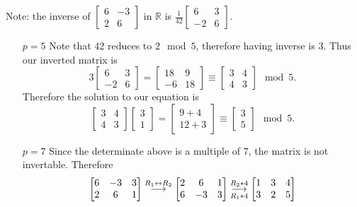\documentclass[12pt, letterpaper]{article}
\newcommand{\R}{\mathbb{R}}
\newcommand{\grstep}[2][\relax]{%
   \ensuremath{\mathrel{
       {\mathop{\longrightarrow}\limits^{#2\mathstrut}_{
                                     \begin{subarray}{l} #1 \end{subarray}}}}}}
\newcommand{\swap}{\leftrightarrow}
\begin{document}
\begin{enumerate}
	Note: the inverse of $\begin{bmatrix}6 & -3\\ 2 & 6 \end{bmatrix}$ in $\R$ is 
	$\frac{1}{42}\begin{bmatrix}6 & 3\\ -2 & 6 \end{bmatrix}$.
	\begin{enumerate}
		\item[$p=5$] 
			Note that 42 reduces to $2 \mod 5$, therefore having inverse is $3$.
			Thus our inverted matrix is 
			$$
			3 \begin{bmatrix}6 & 3\\ -2 & 6 \end{bmatrix} = \begin{bmatrix}18 & 9\\ -6 & 18 \end{bmatrix} \equiv \begin{bmatrix}3 & 4\\ 4 & 3 \end{bmatrix} \mod{5}.
			$$
			Therefore the solution to our equation is 
			$$
			\begin{bmatrix}3 & 4\\ 4 & 3 \end{bmatrix} \begin{bmatrix} 3 \\ 1\end{bmatrix} = \begin{bmatrix} 9 + 4\\12 + 3	\end{bmatrix} \equiv \begin{bmatrix} 3\\5	\end{bmatrix} \mod{5}.
			$$
		\item[$p=7$] Since the determinate above is a multiple of 7, the matrix is not invertable. Therefore
		\begin{align*}
			\begin{bmatrix}6 & -3 & 3\\ 2 & 6 & 1 \end{bmatrix} \grstep[]{R_1 \swap R_2} 
			\begin{bmatrix}2 & 6 & 1\\ 6 & -3 & 3  \end{bmatrix}
			\grstep[R_1 * 4]{R_2 *4} \begin{bmatrix}1 & 3 & 4\\ 3 & 2 & 5 \end{bmatrix}\\

\end{align*}
\end{enumerate}
\end{enumerate}
\end{document}
